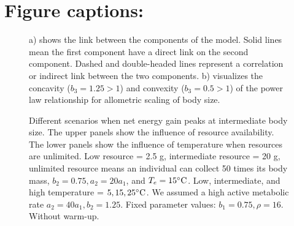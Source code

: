 \section*{Figure captions:}
\begin{figure}[H]
\begin{center}
\caption{
	a) shows the link between the components of the model.
	Solid lines mean the first component have a direct link on the second component.
	Dashed and double-headed lines represent a correlation or indirect link between the two components.
	b) visualizes the concavity ($b_3  = 1.25 > 1$) and convexity ($b_3 = 0.5 > 1$) of the power law relationship for allometric scaling of body size.
}
\label{fig1}
\end{center}
\end{figure}
%
\begin{figure}[H]
\begin{center}
\caption{
	Different scenarios when net energy gain peaks at intermediate body size.
	The upper panels show the influence of resource availability.
	The lower panels show the influence of temperature when resources are unlimited.
	Low resource = 2.5 g, intermediate resource = 20 g, unlimited resource means an individual can collect 50 times its body mass, $b_2 = 0.75, a_2 = 20 a_1$, and $T_e = 15 ^{\circ} \rm{C}$.
	Low, intermediate, and high temperature = $5, 15, 25 ^{\circ} \rm{C}$.
	We assumed a high active metabolic rate $a_2 = 40 a_1, b_2  = 1.25$.
	Fixed parameter values: $b_1 = 0.75, \rho = 16$.
	Without warm-up.
}
\label{fig2}
\end{center}
\end{figure}
